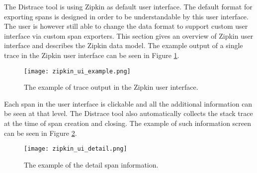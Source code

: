 The Distrace tool is using Zipkin as default user interface. The default format for exporting spans is designed in order to be understandable by this user interface. The user is however still able to change the data format to support custom user interface via custom span exporters. This section gives an overview of Zipkin user interface and describes the Zipkin data model. The example output of a single trace in the Zipkin user interface can be seen in Figure \ref{fig:zipkin_ui}.

\begin{figure}
	\centering
	\texttt{[image: zipkin\_ui\_example.png]}
	\caption{The example of trace output in the Zipkin user interface.}
	\label{fig:zipkin_ui}
\end{figure}

Each span in the user interface is clickable and all the additional information can be seen at that level. The Distrace tool also automatically collects the stack trace at the time of span creation and closing. The example of such information screen can be seen in Figure \ref{fig:zipkin_ui_detail}.
\begin{figure}
	\centering
	\texttt{[image: zipkin\_ui\_detail.png]}
	\caption{The example of the detail span information.}
	\label{fig:zipkin_ui_detail}
\end{figure}
